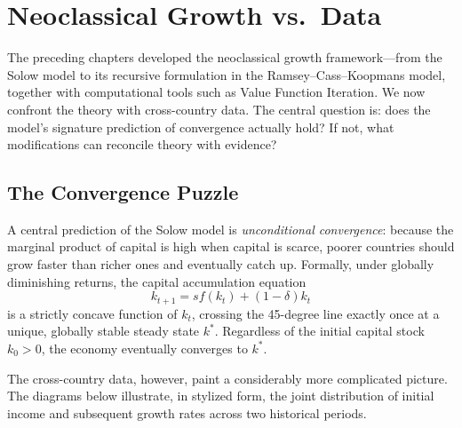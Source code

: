 \chapter{Neoclassical Growth vs.\ Data}

The preceding chapters developed the neoclassical growth framework---from the Solow model to its recursive formulation in the Ramsey--Cass--Koopmans model, together with computational tools such as Value Function Iteration. We now confront the theory with cross-country data. The central question is: does the model's signature prediction of convergence actually hold? If not, what modifications can reconcile theory with evidence?

\section{The Convergence Puzzle}

A central prediction of the Solow model is \textit{unconditional convergence}: because the marginal product of capital is high when capital is scarce, poorer countries should grow faster than richer ones and eventually catch up. Formally, under globally diminishing returns, the capital accumulation equation
\[
k_{t+1} = sf(k_t) + (1-\delta)k_t
\]
is a strictly concave function of $k_t$, crossing the 45-degree line exactly once at a unique, globally stable steady state $k^*$. Regardless of the initial capital stock $k_0 > 0$, the economy eventually converges to $k^*$.

The cross-country data, however, paint a considerably more complicated picture. The diagrams below illustrate, in stylized form, the joint distribution of initial income and subsequent growth rates across two historical periods.

